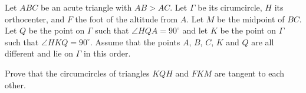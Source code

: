 Let $ABC$ be an acute triangle with $AB > AC$. Let $\Gamma $ be its cirumcircle, $H$ its orthocenter, and $F$ the foot of the altitude from $A$. Let $M$ be the midpoint of $BC$. Let $Q$ be the point on $\Gamma$ such that $\angle HQA = 90^{\circ}$ and let $K$ be the point on $\Gamma$ such that $\angle HKQ = 90^{\circ}$. Assume that the points $A$,  $B$,  $C$,  $K$ and $Q$ are all different and lie on $\Gamma$ in this order.

Prove that the circumcircles of triangles $KQH$ and $FKM$ are tangent to each other.